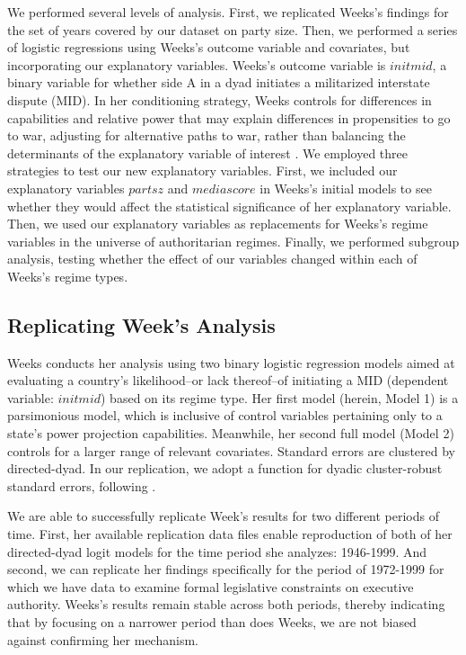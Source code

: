 \documentclass[12pt]{article}
\begin{document}
\par We performed several levels of analysis. First, we replicated Weeks's findings for the set of years covered by our dataset on party size. Then, we performed a series of logistic regressions using Weeks's outcome variable and covariates, but incorporating our explanatory variables. Weeks's outcome variable is $initmid$, a binary variable for whether side A in a dyad initiates a militarized interstate dispute (MID). In her conditioning strategy, Weeks controls for differences in capabilities and relative power that may explain differences in propensities to go to war, adjusting for alternative paths to war, rather than balancing the determinants of the explanatory variable of interest \parencite[127]{morgan:2014}. We employed three strategies to test our new explanatory variables. First, we included our explanatory variables $partsz$ and $media score$ in Weeks's initial models to see whether they would affect the statistical significance of her explanatory variable. Then, we used our explanatory variables as replacements for Weeks's regime variables in the universe of authoritarian regimes. Finally, we performed subgroup analysis, testing whether the effect of our variables changed within each of Weeks's regime types. 

\subsection{Replicating Week's Analysis}

\par Weeks conducts her analysis using two binary logistic regression models aimed at evaluating a country's likelihood--or lack thereof--of initiating a MID (dependent variable: $initmid$) based on its regime type. Her first model (herein, Model 1) is a parsimonious model, which is inclusive of control variables pertaining only to a state's power projection capabilities. Meanwhile, her second full model (Model 2) controls for a larger range of relevant covariates. Standard errors are clustered by directed-dyad. In our replication, we adopt a function for dyadic cluster-robust standard errors, following \textcite{aronow:2015}.

\par We are able to successfully replicate Week's results for two different periods of time. First, her available replication data files enable reproduction of both of her directed-dyad logit models for the time period she analyzes: 1946-1999. And second, we can replicate her findings specifically for the period of 1972-1999 for which we have data to examine formal legislative constraints on executive authority. Weeks's results remain stable across both periods, thereby indicating that by focusing on a narrower period than does Weeks, we are not biased against confirming her mechanism.
\end{document}
